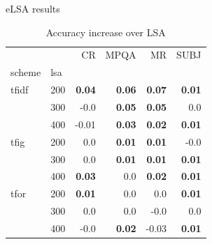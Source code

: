 \documentclass[xcolor={table}]{beamer}
\begin{document}
\begin{frame}{eLSA results}
    \small
\begin{table}[H]
\begin{center}

\begin{tabular}{ll|rrrr}
\toprule
   &   &   CR &  MPQA &   MR &  SUBJ \\
scheme & lsa &        &        &        &        \\
\midrule
tfidf & 200 & \textbf{0.04} & \textbf{0.06} & \textbf{0.07} & \textbf{0.01} \\
   & 300 &     -0.0 & \textbf{0.05} & \textbf{0.05} &      0.0 \\
   & 400 &     -0.01 & \textbf{0.03} & \textbf{0.02} & \textbf{0.01} \\
tfig & 200 &      0.0 & \textbf{0.01} & \textbf{0.01} &     -0.0 \\
   & 300 &      0.0 & \textbf{0.01} & \textbf{0.01} & \textbf{0.01} \\
   & 400 & \textbf{0.03} &      0.0 & \textbf{0.02} & \textbf{0.01} \\
tfor & 200 & \textbf{0.01} &      0.0 &      0.0 & \textbf{0.01} \\
   & 300 &      0.0 &      0.0 &     -0.0 &      0.0 \\
   & 400 &     -0.0 & \textbf{0.02} &     -0.03 & \textbf{0.01} \\
\bottomrule
\end{tabular}

\caption[Accuracy increase over LSA]{Accuracy increase over LSA}
\label{tab:batch:results}
\end{center}
\end{table}
\end{frame}
\end{document}
